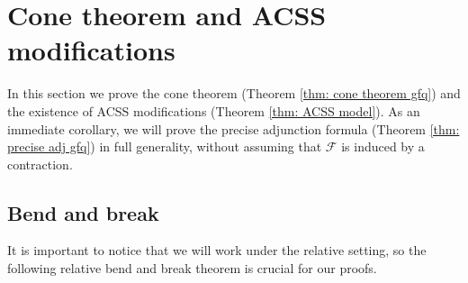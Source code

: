 \documentclass[11pt]{amsart}
\numberwithin{equation}{section}
\newcommand{\Ff}{\mathcal{F}}
\theoremstyle{definition}
\theoremstyle{definition}
\theoremstyle{definition}
\begin{document}
\section{Cone theorem and ACSS modifications}\label{sec: cone}

In this section we prove the cone theorem (Theorem \ref{thm: cone theorem gfq}) and the existence of ACSS modifications (Theorem \ref{thm:  ACSS model}). As an immediate corollary, we will prove the precise adjunction formula (Theorem \ref{thm: precise adj gfq}) in full generality, without assuming that $\Ff$ is induced by a contraction.

\subsection{Bend and break} It is important to notice that we will work under the relative setting, so the following relative bend and break theorem is crucial for our proofs.
\end{document}
